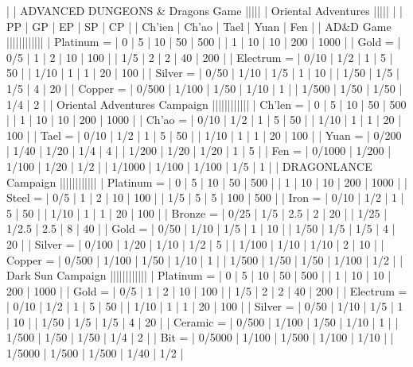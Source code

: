| | ADVANCED DUNGEONS & Dragons Game ||||| | Oriental Adventures |||||
| | PP | GP | EP | SP | CP | | Ch’ien | Ch’ao | Tael | Yuan | Fen |
| AD&D Game ||||||||||||
| Platinum = | 0 | 5 | 10 | 50 | 500 | | 1 | 10 | 10 | 200 | 1000 |
| Gold = | 0/5 | 1 | 2 | 10 | 100 | | 1/5 | 2 | 2 | 40 | 200 |
| Electrum = | 0/10 | 1/2 | 1 | 5 | 50 | | 1/10 | 1 | 1 | 20 | 100 |
| Silver = | 0/50 | 1/10 | 1/5 | 1 | 10 | | 1/50 | 1/5 | 1/5 | 4 | 20 |
| Copper = | 0/500 | 1/100 | 1/50 | 1/10 | 1 | | 1/500 | 1/50 | 1/50 | 1/4 | 2 |
| Oriental Adventures Campaign ||||||||||||
| Ch’len = | 0 | 5 | 10 | 50 | 500 | | 1 | 10 | 10 | 200 | 1000 |
| Ch’ao = | 0/10 | 1/2 | 1 | 5 | 50 | | 1/10 | 1 | 1 | 20 | 100 |
| Tael = | 0/10 | 1/2 | 1 | 5 | 50 | | 1/10 | 1 | 1 | 20 | 100 |
| Yuan = | 0/200 | 1/40 | 1/20 | 1/4 | 4 | | 1/200 | 1/20 | 1/20 | 1 | 5 |
| Fen = | 0/1000 | 1/200 | 1/100 | 1/20 | 1/2 | | 1/1000 | 1/100 | 1/100 | 1/5 | 1 |
| DRAGONLANCE Campaign ||||||||||||
| Platinum = | 0 | 5 | 10 | 50 | 500 | | 1 | 10 | 10 | 200 | 1000 |
| Steel = | 0/5 | 1 | 2 | 10 | 100 | | 1/5 | 5 | 5 | 100 | 500 |
| Iron = | 0/10 | 1/2 | 1 | 5 | 50 | | 1/10 | 1 | 1 | 20 | 100 |
| Bronze = | 0/25 | 1/5 | 2.5 | 2 | 20 | | 1/25 | 1/2.5 | 2.5 | 8 | 40 |
| Gold = | 0/50 | 1/10 | 1/5 | 1 | 10 | | 1/50 | 1/5 | 1/5 | 4 | 20 |
| Silver = | 0/100 | 1/20 | 1/10 | 1/2 | 5 | | 1/100 | 1/10 | 1/10 | 2 | 10 |
| Copper = | 0/500 | 1/100 | 1/50 | 1/10 | 1 | | 1/500 | 1/50 | 1/50 | 1/100 | 1/2 |
| Dark Sun Campaign ||||||||||||
| Platinum = | 0 | 5 | 10 | 50 | 500 | | 1 | 10 | 10 | 200 | 1000 |
| Gold = | 0/5 | 1 | 2 | 10 | 100 | | 1/5 | 2 | 2 | 40 | 200 |
| Electrum = | 0/10 | 1/2 | 1 | 5 | 50 | | 1/10 | 1 | 1 | 20 | 100 |
| Silver = | 0/50 | 1/10 | 1/5 | 1 | 10 | | 1/50 | 1/5 | 1/5 | 4 | 20 |
| Ceramic = | 0/500 | 1/100 | 1/50 | 1/10 | 1 | | 1/500 | 1/50 | 1/50 | 1/4 | 2 |
| Bit = | 0/5000 | 1/100 | 1/500 | 1/100 | 1/10 | | 1/5000 | 1/500 | 1/500 | 1/40 | 1/2 |

